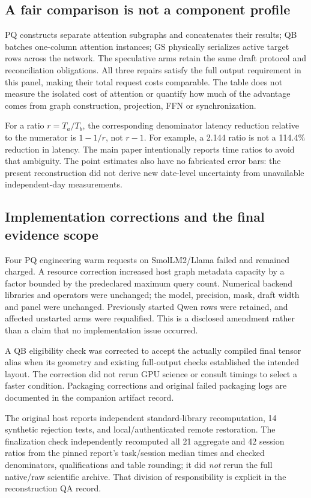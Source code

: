 \subsection{A fair comparison is not a component profile}
PQ constructs separate attention subgraphs and concatenates their results; QB batches one-column attention instances; GS physically serializes active target rows across the network. The speculative arms retain the same draft protocol and reconciliation obligations. All three repairs satisfy the full output requirement in this panel, making their total request costs comparable. The table does not measure the isolated cost of attention or quantify how much of the advantage comes from graph construction, projection, FFN or synchronization.

For a ratio $r=T_a/T_b$, the corresponding denominator latency reduction relative to the numerator is $1-1/r$, not $r-1$. For example, a 2.144 ratio is not a 114.4\% reduction in latency. The main paper intentionally reports time ratios to avoid that ambiguity. The point estimates also have no fabricated error bars: the present reconstruction did not derive new date-level uncertainty from unavailable independent-day measurements.

\subsection{Implementation corrections and the final evidence scope}
Four PQ engineering warm requests on SmolLM2/Llama failed and remained charged. A resource correction increased host graph metadata capacity by a factor bounded by the predeclared maximum query count. Numerical backend libraries and operators were unchanged; the model, precision, mask, draft width and panel were unchanged. Previously started Qwen rows were retained, and affected unstarted arms were requalified. This is a disclosed amendment rather than a claim that no implementation issue occurred.

A QB eligibility check was corrected to accept the actually compiled final tensor alias when its geometry and existing full-output checks established the intended layout. The correction did not rerun GPU science or consult timings to select a faster condition. Packaging corrections and original failed packaging logs are documented in the companion artifact record.

The original host reports independent standard-library recomputation, 14 synthetic rejection tests, and local/authenticated remote restoration. The finalization check independently recomputed all 21 aggregate and 42 session ratios from the pinned report's task/session median times and checked denominators, qualifications and table rounding; it did \emph{not} rerun the full native/raw scientific archive. That division of responsibility is explicit in the reconstruction QA record.
